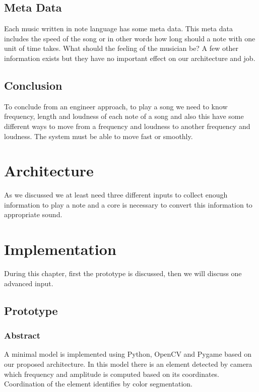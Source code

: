 \section{Meta Data}
Each music written in note language has some meta data. This meta data includes the speed of the song or in other words how long should a note with one unit of time takes. What should the feeling of the musician be? A few other information exists but they have no important effect on our architecture and job. 


\section{Conclusion}
To conclude from an engineer approach, to play a song we need to know frequency, length and loudness of each note of a song and also this have some different ways to move from a frequency and loudness to another frequency and loudness. The system must be able to move fast or smoothly. 


\chapter{Architecture}
As we discussed we at least need three different inputs to collect enough information to play a note and a core is necessary to convert this information to appropriate sound. 


\pagebreak
\chapter{Implementation}
During this chapter, first the prototype is discussed, then we will discuss one advanced input. 

\section{Prototype}

\subsection{Abstract}{A minimal model is implemented using Python, OpenCV and Pygame based on our proposed architecture. In this model there is an element detected by camera which frequency and amplitude is computed based on its coordinates. Coordination of the element identifies by color segmentation.}


